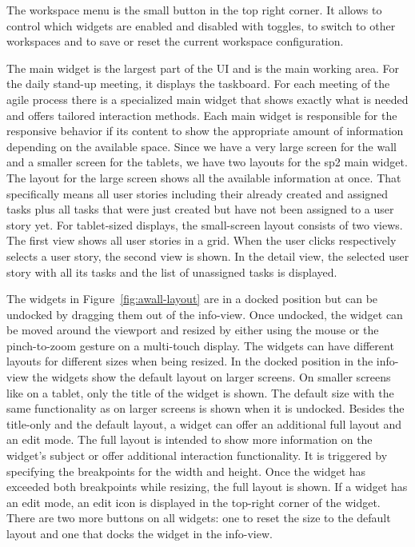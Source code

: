\documentclass{sigchi}
\begin{document}
The workspace menu is the small button in the top right corner.
It allows to control which widgets are enabled and disabled with toggles, to switch to other workspaces and to save or reset the current workspace configuration.

The main widget is the largest part of the UI and is the main working area.
For the daily stand-up meeting, it displays the taskboard.
For each meeting of the agile process there is a specialized main widget that shows exactly what is needed and offers tailored interaction methods.
Each main widget is responsible for the responsive behavior if its content to show the appropriate amount of information depending on the available space.
Since we have a very large screen for the wall and a smaller screen for the tablets, we have two layouts for the \gls{sp2} main widget.
The layout for the large screen shows all the available information at once.
That specifically means all user stories including their already created and assigned tasks plus all tasks that were just created but have not been assigned to a user story yet.
For tablet-sized displays, the small-screen layout consists of two views.
The first view shows all user stories in a grid.
When the user clicks respectively selects a user story, the second view is shown.
In the detail view, the selected user story with all its tasks and the list of unassigned tasks is displayed.


The widgets in Figure~\ref{fig:awall-layout} are in a docked position but can be undocked by dragging them out of the info-view.
Once undocked, the widget can be moved around the viewport and resized by either using the mouse or the pinch-to-zoom gesture on a multi-touch display. 
The widgets can have different layouts for different sizes when being resized.
In the docked position in the info-view the widgets show the default layout on larger screens. 
On smaller screens like on a tablet, only the title of the widget is shown.
The default size with the same functionality as on larger screens is shown when it is undocked.
Besides the title-only and the default layout, a widget can offer an additional full layout and an edit mode.
The full layout is intended to show more information on the widget's subject or offer additional interaction functionality.
It is triggered by specifying the breakpoints for the width and height.
Once the widget has exceeded both breakpoints while resizing, the full layout is shown.
If a widget has an edit mode, an edit icon is displayed in the top-right corner of the widget.
There are two more buttons on all widgets: one to reset the size to the default layout and one that docks the widget in the info-view.
\end{document}

